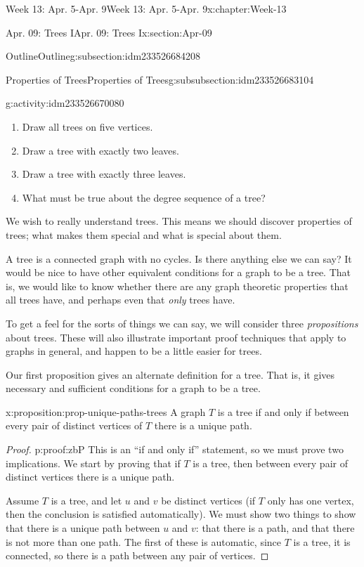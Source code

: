 \documentclass[oneside,10pt,]{book}
\numberwithin{equation}{section}
\begin{document}
\begin{chapterptx}{Week 13: Apr. 5-Apr. 9}{}{Week 13: Apr. 5-Apr. 9}{}{}{x:chapter:Week-13}
\begin{sectionptx}{Apr. 09: Trees I}{}{Apr. 09: Trees I}{}{}{x:section:Apr-09}
\begin{subsectionptx}{Outline}{}{Outline}{}{}{g:subsection:idm233526684208}
\begin{subsubsectionptx}{Properties of Trees}{}{Properties of Trees}{}{}{g:subsubsection:idm233526683104}
\begin{activity}{}{g:activity:idm233526670080}
\begin{enumerate}
\item{}Draw all trees on five vertices.%
\item{}Draw a tree with exactly two leaves.%
\item{}Draw a tree with exactly three leaves.%
\item{}What must be true about the degree sequence of a tree?%
\end{enumerate}
\end{activity}%
We wish to really understand trees. This means we should discover properties of trees; what makes them special and what is special about them.%
\par
A tree is a connected graph with no cycles. Is there anything else we can say? It would be nice to have other equivalent conditions for a graph to be a tree. That is, we would like to know whether there are any graph theoretic properties that all trees have, and perhaps even that \emph{only} trees have.%
\par
To get a feel for the sorts of things we can say, we will consider three \emph{propositions} about trees.  These will also illustrate important proof techniques that apply to graphs in general, and happen to be a little easier for trees.%
\par
Our first proposition gives an alternate definition for a tree.  That is, it gives necessary and sufficient conditions for a graph to be a tree.%
\begin{proposition}{}{}{x:proposition:prop-unique-paths-trees}%
A graph \(T\) is a tree if and only if between every pair of distinct vertices of \(T\) there is a unique path.%
\end{proposition}
\begin{proof}{}{p:proof:zbP}
This is an ``if and only if'' statement, so we must prove two implications.  We start by proving that if \(T\) is a tree, then between every pair of distinct vertices there is a unique path.%
\par
Assume \(T\) is a tree, and let \(u\) and \(v\) be distinct vertices (if \(T\) only has one vertex, then the conclusion is satisfied automatically).  We must show two things to show that there is a unique path between \(u\) and \(v\): that there is a path, and that there is not more than one path.  The first of these is automatic, since \(T\) is a tree, it is connected, so there is a path between any pair of vertices.%
\par

\end{proof}
\end{subsubsectionptx}
\end{subsectionptx}
\end{sectionptx}
\end{chapterptx}
\end{document}
